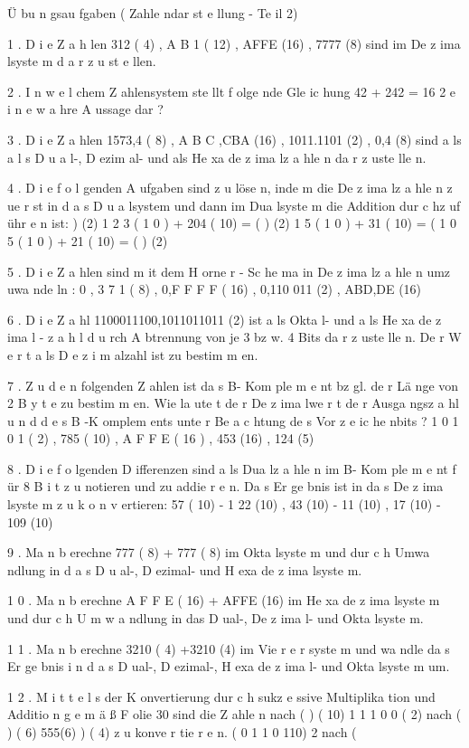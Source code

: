 \documentclass[12pt,a4paper]{scrreprt}
\begin{document}
Ü bu n gsau fgaben ( Zahle ndar st e llung - Te il 2)

1 . D i e Z a h len 312 ( 4) , A B 1 ( 12) , AFFE (16) , 7777 (8) sind im De z ima lsyste m
d a r z u st e llen.

2 . I n w e l chem Z ahlensystem ste llt f olge nde Gle ic hung 42 + 242 = 16 2
e i n e w a hre A ussage dar ?

3 . D i e Z a hlen 1573,4 ( 8) , A B C ,CBA (16) , 1011.1101 (2) , 0,4 (8) sind a ls
a l s D u a l-, D ezim al- und als He xa de z ima lz a hle n da r z uste lle n.

4 . D i e f o l genden A ufgaben sind z u löse n, inde m die De z ima lz a hle n z ue r st in
d a s D u a lsystem und dann im Dua lsyste m die Addition dur c hz uf ühr e n ist:
) (2)
1 2 3 ( 1 0 ) + 204 ( 10) = (
) (2)
1 5 ( 1 0 ) + 31 ( 10) = (
1 0 5 ( 1 0 ) + 21 ( 10) = (
) (2)

5 . D i e Z a hlen sind m it dem H orne r - Sc he ma in De z ima lz a hle n umz uwa nde ln :
0 , 3 7 1 ( 8) , 0,F F F F ( 16) , 0,110 011 (2) , ABD,DE (16)

6 . D i e Z a hl 1100011100,1011011011 (2) ist a ls Okta l- und a ls He xa de z ima l -
z a h l d u rch A btrennung von je 3 bz w. 4 Bits da r z uste lle n. De r W e r t a ls
D e z i m alzahl ist zu bestim m en.

7 . Z u d e n folgenden Z ahlen ist da s B- Kom ple m e nt bz gl. de r Lä nge von
2 B y t e zu bestim m en. Wie la ute t de r De z ima lwe r t de r Ausga ngsz a hl
u n d d e s B -K omplem ents unte r Be a c htung de s Vor z e ic he nbits ?
1 0 1 0 1 ( 2) , 785 ( 10) , A F F E ( 16 ) , 453 (16) , 124 (5)

8 . D i e f o lgenden D ifferenzen sind a ls Dua lz a hle n im B- Kom ple m e nt f ür
8 B i t z u notieren und zu addie r e n. Da s Er ge bnis ist in da s De z ima lsyste m
z u k o n v ertieren:
57 ( 10) - 1 22 (10) , 43 (10) - 11 (10) , 17 (10) - 109 (10)

9 . Ma n b erechne 777 ( 8) + 777 ( 8) im Okta lsyste m und dur c h Umwa ndlung in
d a s D u al-, D ezimal- und H exa de z ima lsyste m.

1 0 . Ma n b erechne A F F E ( 16) + AFFE (16) im He xa de z ima lsyste m und dur c h
U m w a ndlung in das D ual-, De z ima l- und Okta lsyste m.

1 1 . Ma n b erechne 3210 ( 4) +3210 (4) im Vie r e r syste m und wa ndle da s Er ge bnis
i n d a s D ual-, D ezimal-, H exa de z ima l- und Okta lsyste m um.

1 2 . M i t t e l s der K onvertierung dur c h sukz e ssive Multiplika tion und Additio n
g e m ä ß F olie 30 sind die Z ahle n
nach (
) ( 10)
1 1 1 0 0 ( 2)
nach (
) ( 6)
555(6)
) ( 4)
z u konve r tie r e n.
( 0 1 1 0 110) 2 nach (
\end{document}
